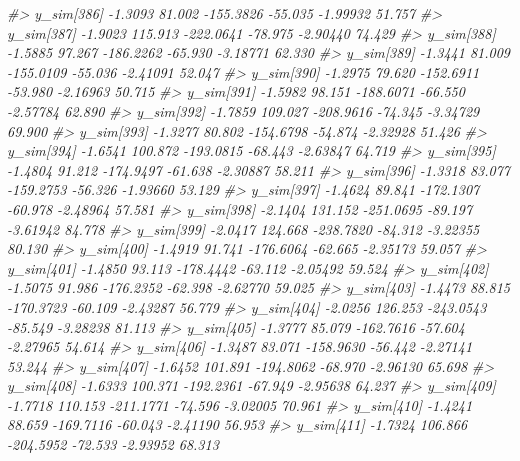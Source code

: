\documentclass[
  10pt,
  italian,
  a4paper,
  extrafontsizes,onecolumn,openright
  ]{memoir}
\newenvironment{Shaded}{\begin{snugshade}}{\end{snugshade}}
\newcommand{\CommentTok}[1]{\textcolor[rgb]{0.56,0.35,0.01}{\textit{#1}}}
\begin{document}
\begin{Shaded}
\begin{Highlighting}[]
\CommentTok{\#\textgreater{}   y\_sim[386] {-}1.3093  81.002 {-}155.3826 {-}55.035 {-}1.99932 51.757}
\CommentTok{\#\textgreater{}   y\_sim[387] {-}1.9023 115.913 {-}222.0641 {-}78.975 {-}2.90440 74.429}
\CommentTok{\#\textgreater{}   y\_sim[388] {-}1.5885  97.267 {-}186.2262 {-}65.930 {-}3.18771 62.330}
\CommentTok{\#\textgreater{}   y\_sim[389] {-}1.3441  81.009 {-}155.0109 {-}55.036 {-}2.41091 52.047}
\CommentTok{\#\textgreater{}   y\_sim[390] {-}1.2975  79.620 {-}152.6911 {-}53.980 {-}2.16963 50.715}
\CommentTok{\#\textgreater{}   y\_sim[391] {-}1.5982  98.151 {-}188.6071 {-}66.550 {-}2.57784 62.890}
\CommentTok{\#\textgreater{}   y\_sim[392] {-}1.7859 109.027 {-}208.9616 {-}74.345 {-}3.34729 69.900}
\CommentTok{\#\textgreater{}   y\_sim[393] {-}1.3277  80.802 {-}154.6798 {-}54.874 {-}2.32928 51.426}
\CommentTok{\#\textgreater{}   y\_sim[394] {-}1.6541 100.872 {-}193.0815 {-}68.443 {-}2.63847 64.719}
\CommentTok{\#\textgreater{}   y\_sim[395] {-}1.4804  91.212 {-}174.9497 {-}61.638 {-}2.30887 58.211}
\CommentTok{\#\textgreater{}   y\_sim[396] {-}1.3318  83.077 {-}159.2753 {-}56.326 {-}1.93660 53.129}
\CommentTok{\#\textgreater{}   y\_sim[397] {-}1.4624  89.841 {-}172.1307 {-}60.978 {-}2.48964 57.581}
\CommentTok{\#\textgreater{}   y\_sim[398] {-}2.1404 131.152 {-}251.0695 {-}89.197 {-}3.61942 84.778}
\CommentTok{\#\textgreater{}   y\_sim[399] {-}2.0417 124.668 {-}238.7820 {-}84.312 {-}3.22355 80.130}
\CommentTok{\#\textgreater{}   y\_sim[400] {-}1.4919  91.741 {-}176.6064 {-}62.665 {-}2.35173 59.057}
\CommentTok{\#\textgreater{}   y\_sim[401] {-}1.4850  93.113 {-}178.4442 {-}63.112 {-}2.05492 59.524}
\CommentTok{\#\textgreater{}   y\_sim[402] {-}1.5075  91.986 {-}176.2352 {-}62.398 {-}2.62770 59.025}
\CommentTok{\#\textgreater{}   y\_sim[403] {-}1.4473  88.815 {-}170.3723 {-}60.109 {-}2.43287 56.779}
\CommentTok{\#\textgreater{}   y\_sim[404] {-}2.0256 126.253 {-}243.0543 {-}85.549 {-}3.28238 81.113}
\CommentTok{\#\textgreater{}   y\_sim[405] {-}1.3777  85.079 {-}162.7616 {-}57.604 {-}2.27965 54.614}
\CommentTok{\#\textgreater{}   y\_sim[406] {-}1.3487  83.071 {-}158.9630 {-}56.442 {-}2.27141 53.244}
\CommentTok{\#\textgreater{}   y\_sim[407] {-}1.6452 101.891 {-}194.8062 {-}68.970 {-}2.96130 65.698}
\CommentTok{\#\textgreater{}   y\_sim[408] {-}1.6333 100.371 {-}192.2361 {-}67.949 {-}2.95638 64.237}
\CommentTok{\#\textgreater{}   y\_sim[409] {-}1.7718 110.153 {-}211.1771 {-}74.596 {-}3.02005 70.961}
\CommentTok{\#\textgreater{}   y\_sim[410] {-}1.4241  88.659 {-}169.7116 {-}60.043 {-}2.41190 56.953}
\CommentTok{\#\textgreater{}   y\_sim[411] {-}1.7324 106.866 {-}204.5952 {-}72.533 {-}2.93952 68.313}

\end{Highlighting}
\end{Shaded}
\end{document}
